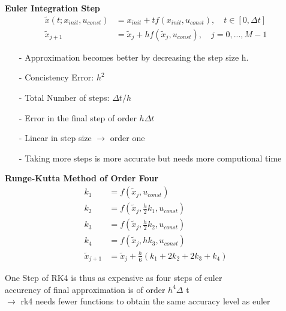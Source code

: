 \begin{tcolorbox}[colback=green!5!white,colframe=green!75!black,title=\textbf{Numerical Integration Methods}]
	
	\textbf{Euler Integration Step}
	\begin{align*}
	\tilde{x}(t; x_{init}, u_{const}) &= x_{init} + t f(x_{init}, u_{const}), \quad t \in [0, \Delta t]\\
	\tilde{x}_{j+1} &= \tilde{x}_j + h f (\tilde{x}_j, u_{const}), \quad j = 0, ..., M - 1
	\end{align*}
	\begin{itemize}
		\item[-] Approximation becomes better by decreasing the step size h.
		\item[-] Concistency Error: $h^2$
		\item[-] Total Number of steps: $\Delta t / h$
		\item[-] Error in the final step of order $h \Delta t$
		\item[-] Linear in step size $\rightarrow$ order one
		\item[-] Taking more steps is more accurate but needs more computional time
	\end{itemize}
	
	\textbf{Runge-Kutta Method of Order Four}
	\begin{align*}
		k_1 &= f(\tilde{x}_j, u_{const})\\
		k_2 &= f(\tilde{x}_j, \frac{h}{2} k_1, u_{const})\\
		k_3 &= f(\tilde{x}_j, \frac{h}{2} k_2, u_{const})\\
		k_4 &= f(\tilde{x}_j, h k_3, u_{const})\\
		\tilde{x}_{j+1} &= \tilde{x}_j + \frac{h}{6} (k_1 + 2k_2 + 2k_3 + k_4)
	\end{align*}
	
	One Step of RK4 is thus as expensive as four steps of euler\\
	accurency of final approximation is of order $h^4 \Delta$ t\\
	$\rightarrow$ rk4 needs fewer functions to obtain the same accuracy level as euler
\end{tcolorbox}

